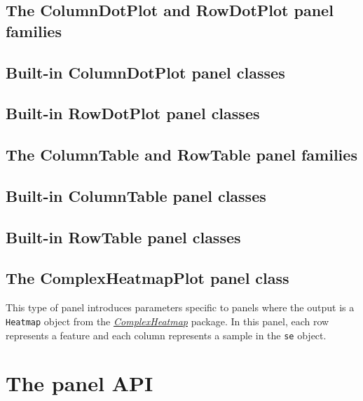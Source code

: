 \documentclass[]{book}
\begin{document}
\section{The ColumnDotPlot and RowDotPlot panel
families}\label{the-columndotplot-and-rowdotplot-panel-families}

\section{Built-in ColumnDotPlot panel
classes}\label{built-in-columndotplot-panel-classes}

\section{Built-in RowDotPlot panel
classes}\label{built-in-rowdotplot-panel-classes}

\section{The ColumnTable and RowTable panel
families}\label{the-columntable-and-rowtable-panel-families}

\section{Built-in ColumnTable panel
classes}\label{built-in-columntable-panel-classes}

\section{Built-in RowTable panel
classes}\label{built-in-rowtable-panel-classes}

\hypertarget{complexheatmapplot-class}{\section{The ComplexHeatmapPlot
panel class}\label{complexheatmapplot-class}}

This type of panel introduces parameters specific to panels where the
output is a \texttt{Heatmap} object from the
\emph{\href{https://bioconductor.org/packages/3.11/ComplexHeatmap}{ComplexHeatmap}}
package. In this panel, each row represents a feature and each column
represents a sample in the \texttt{se} object.

\chapter{The panel API}\label{api}
\end{document}

